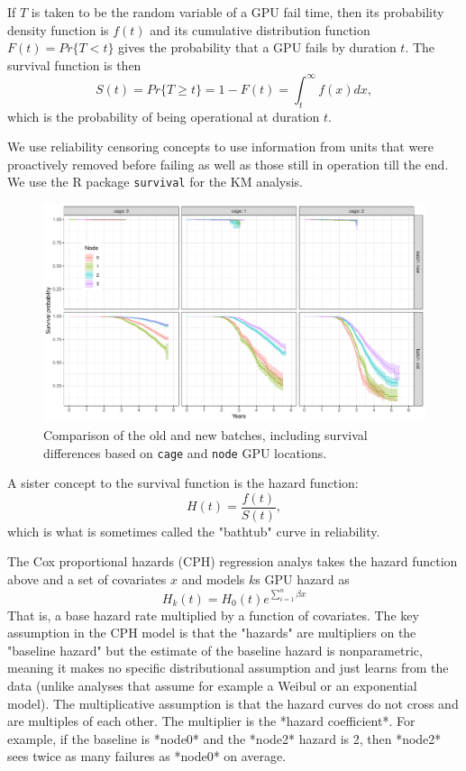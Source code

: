 If $T$ is taken to be the random variable of a GPU fail time, then its
probability density function is $f(t)$ and its cumulative distribution
function $F(t) = Pr\{T < t\}$ gives the probability that a GPU fails
by duration $t$. The survival function is then 
\begin{displaymath}
  S(t) = Pr\{T \geq t\} = 1 - F(t) = \int_t^\infty f(x)dx,
\end{displaymath}
which is the probability of being operational at duration
$t$.

We use reliability censoring concepts to use information from units
that were proactively removed before failing as well as those still in
operation till the end. We use the R package {\tt survival} for the KM
analysis.
\begin{figure}
  \centering
  \includegraphics[width=7in]{figs/km_cage-node_a001.pdf}
  \caption{Comparison of the old and new batches, including survival
    differences based on {\tt cage} and {\tt node} GPU locations.}
  \label{fig:km-all-cage-node}
\end{figure}

A sister concept to the survival function is the hazard function:
\begin{displaymath}
  H(t) = \frac{f(t)}{S(t)},
\end{displaymath}
which is what is sometimes called the "bathtub" curve in reliability.


The Cox proportional hazards (CPH) regression analys
\cite{Cox1972,Harrell2015} takes the hazard function above and a set
of covariates $x$ and models $k$s GPU hazard as 
\begin{displaymath}
  H_k(t) = H_0(t)e^{\sum\limits_{i=1}^n{\beta x}}
\end{displaymath}
That is, a base hazard rate multiplied by a function of
covariates. The key assumption in the CPH model is that the "hazards"
are multipliers on the "baseline hazard" but the estimate of the
baseline hazard is nonparametric, meaning it makes no specific
distributional assumption and just learns from the data (unlike
analyses that assume for example a Weibul or an exponential
model). The multiplicative assumption is that the hazard curves do not
cross and are multiples of each other. The multiplier is the *hazard
coefficient*. For example, if the baseline is *node0* and the *node2*
hazard is 2, then *node2* sees twice as many failures as *node0* on
average. 

